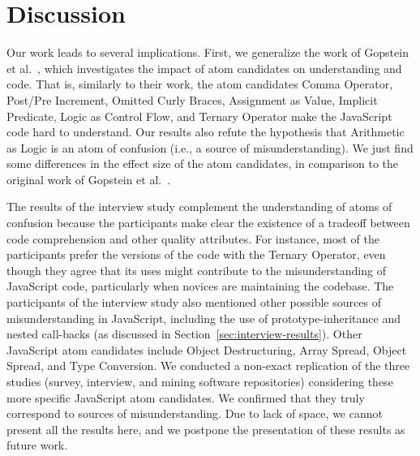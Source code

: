 \section{Discussion}
\label{sec:discussion}

Our work leads to several implications.
First, we generalize the
work of Gopstein et al.~\cite{DBLP:conf/sigsoft/GopsteinIYDZYC17},
which investigates
the impact of atom candidates on
understanding \clang and \cpplang code. That is,
similarly to their work, the atom candidates
Comma Operator, Post/Pre Increment, Omitted Curly Braces,
Assignment as Value, Implicit Predicate, Logic as
Control Flow, and Ternary Operator make the 
JavaScript code hard to understand. Our results also 
refute the hypothesis that Arithmetic as Logic is an atom of
confusion (i.e., a source of misunderstanding).
We just find some differences in the effect size
of the atom candidates, in comparison to the original
work of Gopstein et al.~\cite{DBLP:conf/sigsoft/GopsteinIYDZYC17}.


The results of the interview study complement the understanding of atoms of confusion because the participants make clear the existence of a tradeoff between code comprehension and other quality attributes. For instance, most of the participants prefer the versions of the code with the Ternary Operator, even though they agree that its uses might contribute to the misunderstanding of JavaScript code, particularly when novices are maintaining the codebase. The participants of the interview study also mentioned other possible sources of misunderstanding in JavaScript,
including the use of prototype-inheritance and nested call-backs (as discussed in Section~\ref{sec:interview-results}). Other JavaScript atom candidates include
Object Destructuring, Array Spread, Object Spread, and Type Conversion. We conducted a non-exact replication of the three studies (survey, interview, and mining software repositories) considering these more specific JavaScript atom candidates. We confirmed that they truly correspond to sources of misunderstanding. Due to lack of space,
we cannot present all the results here, and we postpone the presentation of these results as future work.




